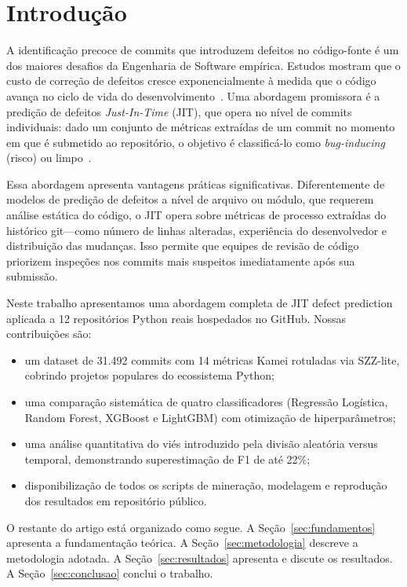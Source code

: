 \documentclass[12pt]{article}
\begin{document}
\section{Introdução}
\label{sec:intro}

A identificação precoce de commits que introduzem defeitos no código-fonte é um dos
maiores desafios da Engenharia de Software empírica. Estudos mostram que o custo de
correção de defeitos cresce exponencialmente à medida que o código avança no ciclo
de vida do desenvolvimento~\cite{boehm81}. Uma abordagem promissora é a predição de
defeitos \textit{Just-In-Time} (JIT), que opera no nível de commits individuais:
dado um conjunto de métricas extraídas de um commit no momento em que é submetido
ao repositório, o objetivo é classificá-lo como \textit{bug-inducing} (risco) ou
limpo~\cite{kamei2013}.

Essa abordagem apresenta vantagens práticas significativas. Diferentemente de modelos
de predição de defeitos a nível de arquivo ou módulo, que requerem análise estática
do código, o JIT opera sobre métricas de processo extraídas do histórico git---como
número de linhas alteradas, experiência do desenvolvedor e distribuição das mudanças.
Isso permite que equipes de revisão de código priorizem inspeções nos commits mais
suspeitos imediatamente após sua submissão.

Neste trabalho apresentamos uma abordagem completa de JIT defect prediction
aplicada a 12 repositórios Python reais hospedados no GitHub. Nossas contribuições são:
\begin{itemize}
  \item um dataset de 31.492 commits com 14 métricas Kamei rotuladas via SZZ-lite,
        cobrindo projetos populares do ecossistema Python;
  \item uma comparação sistemática de quatro classificadores (Regressão Logística,
        Random Forest, XGBoost e LightGBM) com otimização de hiperparâmetros;
  \item uma análise quantitativa do viés introduzido pela divisão aleatória versus
        temporal, demonstrando superestimação de F1 de até 22\%;
  \item disponibilização de todos os scripts de mineração, modelagem e reprodução
        dos resultados em repositório público.
\end{itemize}

O restante do artigo está organizado como segue. A Seção~\ref{sec:fundamentos}
apresenta a fundamentação teórica. A Seção~\ref{sec:metodologia} descreve a
metodologia adotada. A Seção~\ref{sec:resultados} apresenta e discute os resultados.
A Seção~\ref{sec:conclusao} conclui o trabalho.
\end{document}

